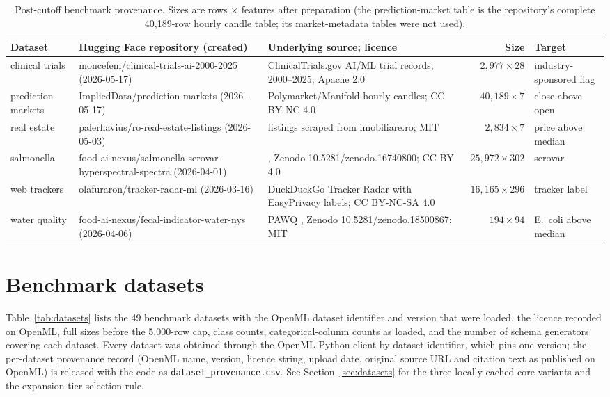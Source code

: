 \begin{table}[htbp]
\caption{Post-cutoff benchmark provenance. Sizes are rows $\times$ features after preparation (the prediction-market table is the repository's complete 40,189-row hourly candle table; its market-metadata tables were not used).}\label{tab:postcutoff-data}
\centering
\scriptsize
\begin{adjustbox}{max width=\linewidth}
\begin{tabular}{>{\raggedright\arraybackslash}p{1.9cm}>{\raggedright\arraybackslash}p{3.5cm}>{\raggedright\arraybackslash}p{3.7cm}r>{\raggedright\arraybackslash}p{1.8cm}}
\toprule
Dataset & Hugging Face repository (created) & Underlying source; licence & Size & Target \\
\midrule
clinical trials & moncefem/clinical-trials-ai-2000-2025 (2026-05-17) & ClinicalTrials.gov AI/ML trial records, 2000--2025; Apache 2.0 & \(2{,}977 \times 28\) & industry-sponsored flag \\
prediction markets & ImpliedData/prediction-markets (2026-05-17) & Polymarket/Manifold hourly candles; CC BY-NC 4.0 & \(40{,}189 \times 7\) & close above open \\
real estate & palerflavius/ro-real-estate-listings (2026-05-03) & listings scraped from imobiliare.ro; MIT & \(2{,}834 \times 7\) & price above median \\
salmonella & food-ai-nexus/salmonella-serovar-hyperspectral-spectra (2026-04-01) & \citet{papa2025rapid}, Zenodo 10.5281/zenodo.16740800; CC BY 4.0 & \(25{,}972 \times 302\) & serovar \\
web trackers & olafuraron/tracker-radar-ml (2026-03-16) & DuckDuckGo Tracker Radar with EasyPrivacy labels; CC BY-NC-SA 4.0 & \(16{,}165 \times 296\) & tracker label \\
water quality & food-ai-nexus/fecal-indicator-water-nys (2026-04-06) & PAWQ \citep{weller2020landscape,green2021integrative}, Zenodo 10.5281/zenodo.18500867; MIT & \(194 \times 94\) & E.~coli above median \\
\bottomrule
\end{tabular}
\end{adjustbox}
\end{table}

\section{Benchmark datasets}\label{app:datasets}

Table~\ref{tab:datasets} lists the 49 benchmark datasets with the OpenML dataset identifier and version that were loaded, the licence recorded on OpenML, full sizes before the 5,000-row cap, class counts, categorical-column counts as loaded, and the number of schema generators covering each dataset. Every dataset was obtained through the OpenML Python client by dataset identifier, which pins one version; the per-dataset provenance record (OpenML name, version, licence string, upload date, original source URL and citation text as published on OpenML) is released with the code as \texttt{dataset\_provenance.csv}. See Section~\ref{sec:datasets} for the three locally cached core variants and the expansion-tier selection rule.


